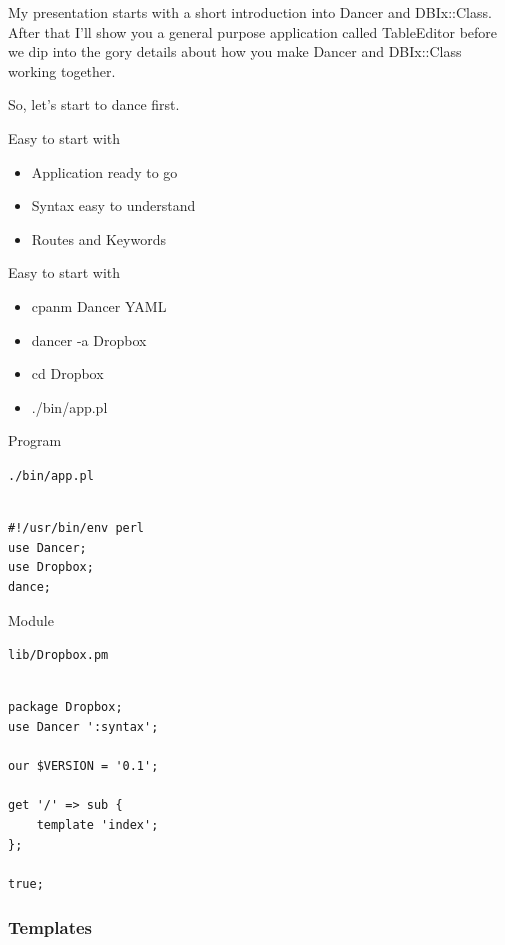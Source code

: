 My presentation starts with a short introduction into Dancer and
DBIx::Class. After that I'll show you a general purpose application
called TableEditor before we dip into the gory details about
how you make Dancer and DBIx::Class working together.

So, let's start to dance first.

\begin{frame}{Easy to start with}
\begin{itemize}
\item Application ready to go
\item Syntax easy to understand
\item Routes and Keywords
\end{itemize}
\end{frame}

\begin{frame}[fragile]{Easy to start with}
\begin{itemize}
\item cpanm Dancer YAML
\item dancer -a Dropbox
\item cd Dropbox
\item ./bin/app.pl
\end{itemize}
\end{frame}
\begin{frame}[fragile]{Program}

\verb|./bin/app.pl|

\begin{lstlisting}

#!/usr/bin/env perl
use Dancer;
use Dropbox;
dance;

\end{lstlisting}

\end{frame}

\begin{frame}[fragile]{Module}

\verb|lib/Dropbox.pm|

\begin{lstlisting}

package Dropbox;
use Dancer ':syntax';

our $VERSION = '0.1';

get '/' => sub {
    template 'index';
};

true;
\end{lstlisting}
\end{frame}

\subsubsection{Templates}

